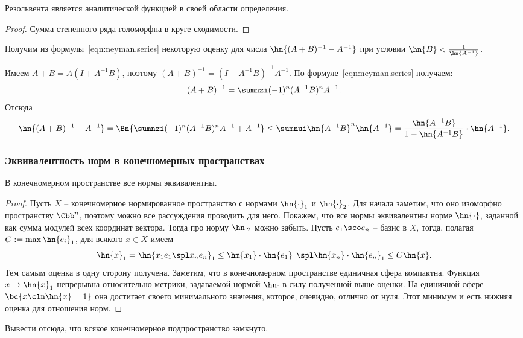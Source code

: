 \documentclass[a4paper]{article}
\begin{document}
\begin{imp}
Резольвента является аналитической функцией в своей области определения.
\end{imp}
\begin{proof}
Сумма степенного ряда голоморфна в круге сходимости.
\end{proof}

Получим из формулы~\eqref{eqn:neyman.series} некоторую оценку для
числа $\hn{(A+B)^{-1}-A^{-1}}$ при условии $\hn{B} < \frac{1}{\hn{A^{-1}}}$.

Имеем $A + B = A(I + A^{-1}B)$, поэтому $(A+B)^{-1} = (I + A^{-1}B)^{-1}A^{-1}$.
По формуле~\eqref{eqn:neyman.series} получаем:
$$(A+B)^{-1} = \sumnzi (-1)^{n}(A^{-1}B)^nA^{-1}.$$
Отсюда
$$\hn{(A+B)^{-1} - A^{-1}} = \Bn{\sumnzi (-1)^n(A^{-1}B)^nA^{-1} + A^{-1}} \le \sumnui \hn{A^{-1}B}^n\hn{A^{-1}} =
\frac{\hn{A^{-1}B}}{1 - \hn{A^{-1}B}}\cdot\hn{A^{-1}}.$$


\subsubsection{Эквивалентность норм в конечномерных пространствах}
\begin{theorem}
В конечномерном пространстве все нормы эквивалентны.
\end{theorem}
\begin{proof}
Пусть $X$ -- конечномерное нормированное пространство с нормами $\hn{\cdot}_1$ и $\hn{\cdot}_2$.
Для начала заметим, что оно изоморфно пространству $\Cbb^n$, поэтому можно все рассуждения проводить
для него. Покажем, что все нормы эквивалентны норме $\hn{\cdot}$, заданной как сумма модулей всех координат вектора.
Тогда про норму $\hn\cdot_2$ можно забыть. Пусть $e_1\sco e_n$ -- базис в $X$, тогда,
полагая $C := \max \hn{e_i}_1$, для всякого $x \in X$ имеем
$$\hn{x}_1 = \hn{x_1e_1\spl x_n e_n}_1 \le \hm{x_1}\cdot \hn{e_1}_1\spl\hm{x_n}\cdot \hn{e_n}_1 \le C \hn{x}.$$
Тем самым оценка в одну сторону получена. Заметим, что в конечномерном пространстве единичная
сфера компактна. Функция $x \mapsto \hn{x}_1$ непрерывна относительно метрики, задаваемой
нормой $\hn\cdot$ в силу полученной выше оценки. На единичной сфере $\bc{x\cln \hn{x} = 1}$ она достигает своего
минимального значения, которое, очевидно, отлично от нуля. Этот минимум и есть нижняя оценка для отношения норм.
\end{proof}

\begin{problem}
Вывести отсюда, что всякое конечномерное подпространство замкнуто.
\end{problem}
\end{document}
